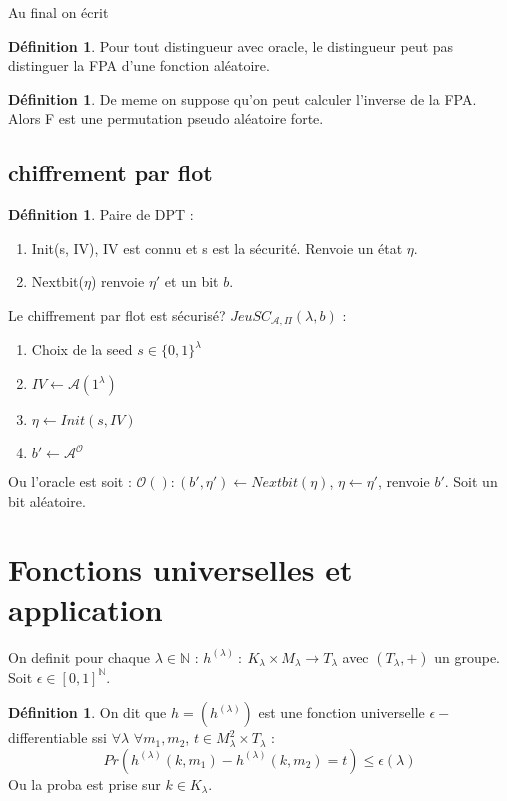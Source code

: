 \documentclass[12pt]{article}
\theoremstyle{plain}
\theoremstyle{definition}
\newtheorem{defn}[subsubsection]{D\'efinition}
\theoremstyle{remark}
\newcommand{\A}{\mathcal{A}}
\newcommand{\N}{\mathbb{N}}
\newcommand{\Or}{\mathcal{O}}
\begin{document}
Au final on écrit 
\begin{defn}
    Pour tout distingueur avec oracle, le distingueur peut pas distinguer la FPA d'une fonction aléatoire.
\end{defn}

\begin{defn}
    De meme on suppose qu'on peut calculer l'inverse de la FPA. Alors F est une permutation pseudo aléatoire forte.
\end{defn}

\subsection{chiffrement par flot}
\begin{defn}
    Paire de DPT :\begin{enumerate}
        \item Init(s, IV), IV est connu et s est la sécurité. Renvoie un état $\eta$.
        \item Nextbit($\eta$) renvoie $\eta'$ et un bit $b$. 
    \end{enumerate}
\end{defn}

Le chiffrement par flot est sécurisé? $JeuSC_{\A,\Pi}(\lambda, b)$ :
\begin{enumerate}
    \item Choix de la seed $s\in \{0,1\}^{\lambda}$
    \item $IV\leftarrow \A(1^{\lambda})$
    \item $\eta\leftarrow Init(s,IV)$
    \item $b'\leftarrow \A^{\Or}$
\end{enumerate}
Ou l'oracle est soit : $\Or(): (b',\eta')\leftarrow Nextbit(\eta)$, $\eta\leftarrow\eta'$, renvoie $b'$. Soit un bit aléatoire.



\section{Fonctions universelles et application}
On definit pour chaque $\lambda\in\N$ : $h^{(\lambda)}~:~K_{\lambda}\times M_{\lambda}\rightarrow T_{\lambda}$
avec $(T_{\lambda},+)$ un groupe. Soit $\epsilon\in [0,1]^{\N}$.

\begin{defn}
    On dit que $h=(h^{(\lambda)})$ est une fonction universelle $\epsilon-$differentiable ssi 
    $\forall\lambda$ $\forall m_1,m_2$, $t\in M_{\lambda}^2\times T_{\lambda}$ :
    $$Pr(h^{(\lambda)}(k,m_1)-h^{(\lambda)}(k,m_2)=t)\leq \epsilon(\lambda)$$
    Ou la proba est prise sur $k\in K_{\lambda}$.
\end{defn}
\end{document}
